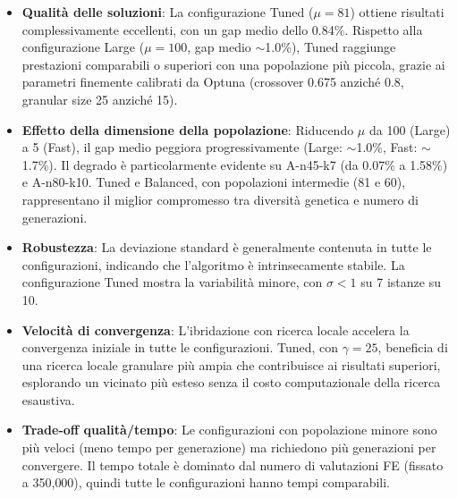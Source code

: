 \begin{itemize}
    \item \textbf{Qualit\`a delle soluzioni}: La configurazione Tuned ($\mu=81$)
    ottiene risultati complessivamente eccellenti, con un gap medio dello 0.84\%.
    Rispetto alla configurazione Large ($\mu=100$, gap medio $\sim$1.0\%), Tuned
    raggiunge prestazioni comparabili o superiori con una popolazione pi\`u piccola,
    grazie ai parametri finemente calibrati da Optuna (crossover 0.675 anzich\'e
    0.8, granular size 25 anzich\'e 15).

    \item \textbf{Effetto della dimensione della popolazione}: Riducendo $\mu$
    da 100 (Large) a 5 (Fast), il gap medio peggiora progressivamente
    (Large: $\sim$1.0\%, Fast: $\sim$1.7\%). Il degrado \`e particolarmente
    evidente su A-n45-k7 (da 0.07\% a 1.58\%) e A-n80-k10. Tuned e Balanced,
    con popolazioni intermedie (81 e 60), rappresentano il miglior compromesso
    tra diversit\`a genetica e numero di generazioni.

    \item \textbf{Robustezza}: La deviazione standard \`e generalmente contenuta
    in tutte le configurazioni, indicando che l'algoritmo \`e intrinsecamente
    stabile. La configurazione Tuned mostra la variabilit\`a minore, con
    $\sigma < 1$ su 7 istanze su 10.

    \item \textbf{Velocit\`a di convergenza}: L'ibridazione con ricerca locale
    accelera la convergenza iniziale in tutte le configurazioni. Tuned,
    con $\gamma=25$, beneficia di una ricerca locale granulare pi\`u ampia
    che contribuisce ai risultati superiori, esplorando un vicinato pi\`u
    esteso senza il costo computazionale della ricerca esaustiva.

    \item \textbf{Trade-off qualit\`a/tempo}: Le configurazioni con popolazione
    minore sono pi\`u veloci (meno tempo per generazione) ma richiedono pi\`u
    generazioni per convergere. Il tempo totale \`e dominato dal numero di
    valutazioni FE (fissato a 350{,}000), quindi tutte le configurazioni
    hanno tempi comparabili.
\end{itemize}
